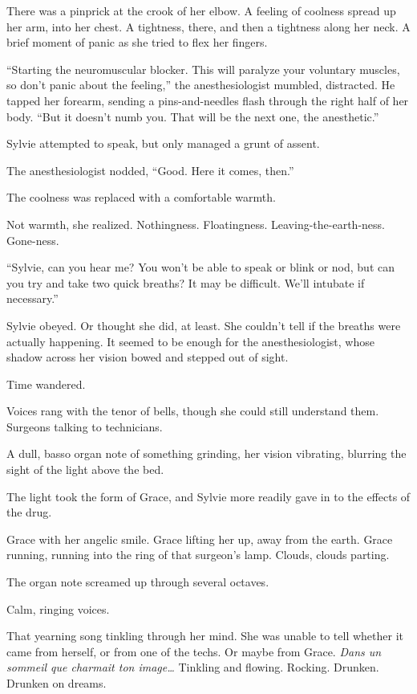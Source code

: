 There was a pinprick at the crook of her elbow. A feeling of coolness spread up her arm, into her chest. A tightness, there, and then a tightness along her neck. A brief moment of panic as she tried to flex her fingers.

``Starting the neuromuscular blocker. This will paralyze your voluntary muscles, so don't panic about the feeling,'' the anesthesiologist mumbled, distracted. He tapped her forearm, sending a pins-and-needles flash through the right half of her body. ``But it doesn't numb you. That will be the next one, the anesthetic.''

Sylvie attempted to speak, but only managed a grunt of assent.

The anesthesiologist nodded, ``Good. Here it comes, then.''

The coolness was replaced with a comfortable warmth.

Not warmth, she realized. Nothingness. Floatingness. Leaving-the-earth-ness. Gone-ness.

``Sylvie, can you hear me? You won't be able to speak or blink or nod, but can you try and take two quick breaths? It may be difficult. We'll intubate if necessary.''

Sylvie obeyed. Or thought she did, at least. She couldn't tell if the breaths were actually happening. It seemed to be enough for the anesthesiologist, whose shadow across her vision bowed and stepped out of sight.

Time wandered.

Voices rang with the tenor of bells, though she could still understand them. Surgeons talking to technicians.

A dull, basso organ note of something grinding, her vision vibrating, blurring the sight of the light above the bed.

The light took the form of Grace, and Sylvie more readily gave in to the effects of the drug.

Grace with her angelic smile. Grace lifting her up, away from the earth. Grace running, running into the ring of that surgeon's lamp. Clouds, clouds parting.

The organ note screamed up through several octaves.

Calm, ringing voices.

That yearning song tinkling through her mind. She was unable to tell whether it came from herself, or from one of the techs. Or maybe from Grace. \emph{Dans un sommeil que charmait ton image\ldots{}} Tinkling and flowing. Rocking. Drunken. Drunken on dreams.

